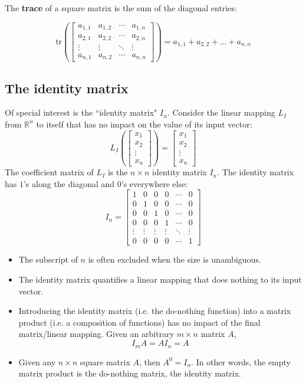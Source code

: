 \documentclass{article}
\begin{document}
The {\bf trace} of a square matrix is the sum of the diagonal entries:

\[\text{tr}\left(\begin{bmatrix} 
a_{1,1} & a_{1,2} & \cdots & a_{1,n} \\ 
a_{2,1} & a_{2,2} & \cdots & a_{2,n} \\
\vdots & \vdots & \ddots & \vdots \\ 
a_{n,1} & a_{n,2} & \cdots & a_{n,n}
\end{bmatrix}\right) = a_{1,1} + a_{2,2} + ... + a_{n,n}\]


\subsection*{The identity matrix}

Of special interest is the ``identity matrix" \(I_n\). Consider the linear mapping \(L_I\) from \(\mathbb{R}^n\) to itself that has no impact on the value of its input vector: 
\[L_I\left(\begin{bmatrix} x_1 \\ x_2 \\ \vdots \\ x_n \end{bmatrix}\right) = \begin{bmatrix} x_1 \\ x_2 \\ \vdots \\ x_n \end{bmatrix}\]    
The coefficient matrix of \(L_I\) is the \(n \times n\) identity matrix \(I_n\). The identity matrix has \(1\)'s along the diagonal and \(0\)'s everywhere else: 
\[I_n = \begin{bmatrix} 
1 & 0 & 0 & 0 & \cdots & 0 \\ 
0 & 1 & 0 & 0 & \cdots & 0 \\
0 & 0 & 1 & 0 & \cdots & 0 \\
0 & 0 & 0 & 1 & \cdots & 0 \\
\vdots & \vdots & \vdots & \vdots & \ddots & \vdots \\
0 & 0 & 0 & 0 & \cdots & 1
\end{bmatrix}\] 

\begin{itemize} 
\item The subscript of \(n\) is often excluded when the size is unambiguous. 
\item The identity matrix quantifies a linear mapping that does nothing to its input vector. 
\item Introducing the identity matrix (i.e. the do-nothing function) into a matrix product (i.e. a composition of functions) has no impact of the final matrix/linear mapping. Given an arbitrary \(m \times n\) matrix \(A\), 
\[I_m A = A I_n = A\]
\item Given any \(n \times n\) square matrix \(A\), then \(A^0 = I_n\). In other words, the empty matrix product is the do-nothing matrix, the identity matrix. 
\end{itemize}
\end{document}
